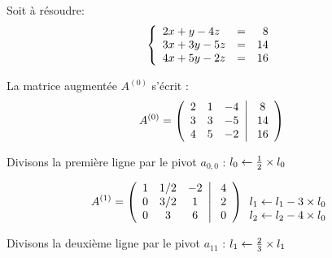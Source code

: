 \documentclass[a4paper, 10pt]{article}
\begin{document}
Soit à résoudre:
\[
\left \{
\begin{array}{l c r}
2x+y-4z & = & 8 \\
3x+3y-5z & = & 14 \\
4x+5y-2z & = & 16 \\
\end{array}
\right .
\]

La matrice augmentée $A^{(0)}$ s'écrit :
\begin{equation}
A^{(0)}=
\left(
\begin{array}{c c c c }
2  & 1   & -4  \\
3  & 3   & -5   \\
4  & 5  & -2  \\ 
\end{array}
\right|
\left.
\begin{array}{c}
8  \\ 14   \\ 16  \\ 
\end{array}
\right)
\end{equation}

Divisons la première ligne par le pivot $a_{0,0}$ :
$l_0 \leftarrow {1 \over 2} \times l_0$

\begin{equation}
A^{(1)}=
\left(
\begin{array}{c c c c }
1  & {1/2}   & -2  \\
0  &  {3/2}   & 1   \\
0  & 3  & 6  \\ 
\end{array}
\right|
\left.
\begin{array}{c}
4   \\ 2    \\ 0  \\ 
\end{array}
\right)
\begin{array}{c}
   \\ l_1 \leftarrow l_1 -3 \times l_0   \\ l_2 \leftarrow l_2 -4 \times l_0  \\ 
\end{array}
\end{equation}

Divisons la deuxième ligne par le pivot $a_{11}$ :
$l_1 \leftarrow {2 \over 3} \times l_1$
\end{document}
